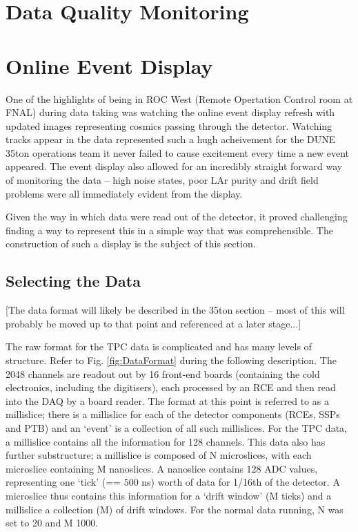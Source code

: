 \section{Data Quality Monitoring}\label{sec:DQM}



\section{Online Event Display}\label{sec:EventDisplay}

One of the highlights of being in ROC West (Remote Opertation Control room at FNAL) during data taking was watching the online event display refresh with updated images representing cosmics passing through the detector.  Watching tracks appear in the data represented such a hugh acheivement for the DUNE 35ton operations team it never failed to cause excitement every time a new event appeared.  The event display also allowed for an incredibly straight forward way of monitoring the data -- high noise states, poor LAr purity and drift field problems were all immediately evident from the display.

Given the way in which data were read out of the detector, it proved challenging finding a way to represent this in a simple way that was comprehensible.  The construction of such a display is the subject of this section.

\subsection{Selecting the Data}\label{sec:SelectingEVDData}

[The data format will likely be described in the 35ton section -- most of this will probably be moved up to that point and referenced at a later stage...]

The raw format for the TPC data is complicated and has many levels of structure.  Refer to Fig. \ref{fig:DataFormat} during the following description.  The 2048 channels are readout out by 16 front-end boards (containing the cold electronics, including the digitisers), each processed by an RCE and then read into the DAQ by a board reader.  The format at this point is referred to as a millislice; there is a millislice for each of the detector components (RCEs, SSPs and PTB) and an `event' is a collection of all such millislices.  For the TPC data, a millislice contains all the information for 128 channels.  This data also has further substructure; a millislice is composed of N microslices, with each microslice containing M nanoslices.  A nanoslice contains 128 ADC values, representing one `tick' (== $500$ ns) worth of data for 1/16th of the detector.  A microslice thus contains this information for a `drift window' (M ticks) and a millislice a collection (M) of drift windows.  For the normal data running, N was set to 20 and M 1000.

